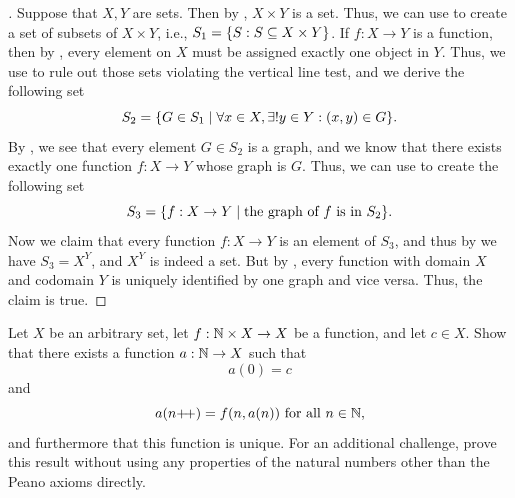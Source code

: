 \begin{proof}[]
  Suppose that \(X, Y\) are sets.
  Then by , \(X \times Y\) is a set.
  Thus, we can use  to create a set of subsets of \(X \times Y\), i.e., \(S_1 = \left\lbrace S : S \subseteq X \times Y\right\rbrace\).
  If \(f : X \to Y\) is a function, then by , every element on \(X\) must be assigned exactly one object in \(Y\).
  Thus, we use  to rule out those sets violating the vertical line test, and we derive the following set
  \[
    S_2 = \set{G \in S_1 \mid \forall x \in X, \exists! y \in Y : (x, y) \in G}.
  \]
  By , we see that every element \(G \in S_2\) is a graph, and we know that there exists exactly one function \(f : X \to Y\) whose graph is \(G\).
  Thus, we can use  to create the following set
  \[
    S_3 = \set{f : X \to Y \mid \text{the graph of } f \text{ is in } S_2}.
  \]
  Now we claim that every function \(f : X \to Y\) is an element of \(S_3\), and thus by  we have \(S_3 = X^Y\), and \(X^Y\) is indeed a set.
  But by , every function with domain \(X\) and codomain \(Y\) is uniquely identified by one graph and vice versa.
  Thus, the claim is true.
\end{proof}

\begin{ex}\label{i:ex:3.5.12}
  Let \(X\) be an arbitrary set, let \(f : \mathbb{N} \times X \to X\) be a function, and let \(c \in X\).
  Show that there exists a function \(a : \mathbb{N} \to X\) such that
  \[
    a(0) = c
  \]
  and
  \[
    a(n{+}\!{+}) = f(n, a(n)) \text{ for all } n \in \mathbb{N},
  \]
  and furthermore that this function is unique.
  For an additional challenge, prove this result without using any properties of the natural numbers other than the Peano axioms directly.
\end{ex}

